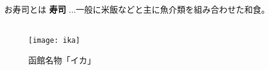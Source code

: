 \begin{frame}[fragile,c]{お寿司とは}
    \centering
    \textbf{寿司} ...一般に米飯などと主に魚介類を組み合わせた和食\cite{sushi_wikipedia}。\\
    　\\
    
    \begin{figure}
        \centering
        \texttt{[image: ika]}
        \caption{函館名物「イカ」}
        \label{fig:ika}
    \end{figure}

\end{frame}
